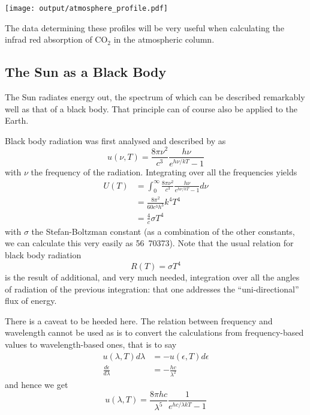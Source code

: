 \documentclass[10pt,a4paper,titlepage]{article}
\begin{document}
\texttt{[image: output/atmosphere\_profile.pdf]}

The data determining these profiles will be very useful when
calculating the infrad red absorption of CO$_{\text{2}}$ in the atmospheric
column.

\subsection{The Sun as a Black Body}
\label{sec-3-2}
The Sun radiates energy out, the spectrum of which can be described
remarkably well as that of a black body. That principle can of course
also be applied to the Earth.

Black body radiation was first analysed and described by
\citet{planck00:energieverteilung} as
\begin{equation}
u(\nu, T) = \frac{8 \pi \nu^2}{c^3} \frac{h \nu}{e^{h \nu / k T} - 1}
\end{equation}
with $\nu$ the frequency of the radiation. Integrating over all the
frequencies yields
\begin{equation}
\begin{split}
U(T) & = \int_0^\infty \frac{8 \pi \nu^2}{c^3} \frac{h \nu}{e^{h \nu / k T} - 1} d \nu\\
     & = \frac{8 \pi^2}{60 c^3 h^3}k^4 T^4 \\
     & = \frac{4}{c} \sigma T^4
\end{split}
\end{equation}
with $\sigma$ the Stefan-Boltzman constant (as a combination of the
other constants, we can calculate this very easily as
\unit{56.70373}{\nano\watt\per\metre\squared\fourth\kelvin}). Note
that the usual relation for black body radiation
\begin{equation}
R(T) = \sigma T^4
\end{equation}
is the result of additional, and very much needed, integration over
all the angles of radiation of the previous integration: that one
addresses the ``uni-directional'' flux of energy.

There is a caveat to be heeded here. The relation between frequency
and wavelength cannot be used as is to convert the calculations from
frequency-based values to wavelength-based ones, that is to say
\begin{equation}
\begin{split}
u(\lambda, T) d\lambda & = -u(\epsilon, T) d\epsilon \\
\frac{d\epsilon}{d\lambda} & = -\frac{h c}{\lambda^2}
\end{split}
\end{equation}
and hence we get
\begin{equation}
u(\lambda, T) = \frac{8 \pi h c}{\lambda^5} \frac{1}{e^{h c /\lambda k T} - 1}
\end{equation}
\end{document}
